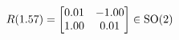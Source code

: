 \documentclass[preview]{standalone}
\begin{document}
\begin{align*}
\special{dvisvgm:raw <g id='unique000'>}R(1.57) = \begin{bmatrix} 0.01 & -1.00 \\ 1.00 & 0.01 \end{bmatrix} \in \text{SO}(2)\special{dvisvgm:raw </g>}
\end{align*}
\end{document}
